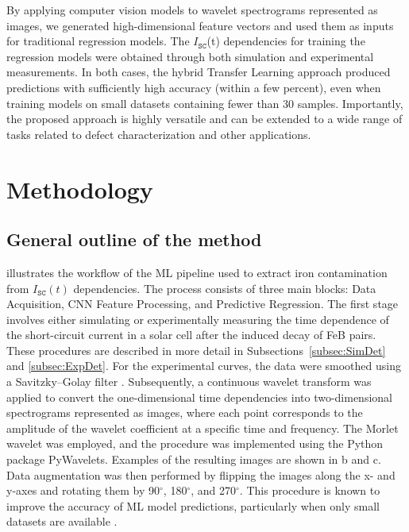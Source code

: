 \documentclass[10pt]{iopart}
\begin{document}
By applying computer vision models to wavelet spectrograms represented as images, we generated high-dimensional feature vectors and used them as inputs for traditional regression models.
The $I_\mathtt{SC}$(t) dependencies for training the regression models were obtained through both simulation and experimental measurements.
In both cases, the hybrid Transfer Learning approach produced predictions with sufficiently high accuracy (within a few percent), even when training models on small datasets containing fewer than 30 samples.
Importantly, the proposed approach is highly versatile and can be extended to a wide range of tasks related to defect characterization and other applications.


\section{Methodology}\label{sec:Exp}

\subsection{General outline of the method}\label{subsec:GenSch}

 illustrates the workflow of the ML pipeline used to extract iron contamination from $I_\mathtt{SC}(t)$ dependencies.
The process consists of three main blocks: Data Acquisition, CNN Feature Processing, and Predictive Regression.
The first stage involves either simulating or experimentally measuring the time dependence 
of the short-circuit current in a solar cell after the induced decay of FeB pairs. 
These procedures are described in more detail in Subsections~\ref{subsec:SimDet} and \ref{subsec:ExpDet}.
For the experimental curves, the data were smoothed using a Savitzky–Golay filter \cite{Krishnan2013}. 
Subsequently, a continuous wavelet transform \cite{Torrence1998} was applied to convert the one-dimensional time dependencies 
into two-dimensional spectrograms represented as images, 
where each point corresponds to the amplitude of the wavelet coefficient at a specific time and frequency. 
The Morlet wavelet was employed, and the procedure was implemented using the Python package PyWavelets. 
Examples of the resulting images are shown in b and c. 
Data augmentation was then performed by flipping the images along the x- and y-axes and rotating them by 90$^{\circ}$, 180$^{\circ}$, and 270$^{\circ}$.
This procedure is known to improve the accuracy of ML model predictions, particularly when only small datasets are available \cite{Ahmad2020}.
\end{document}
